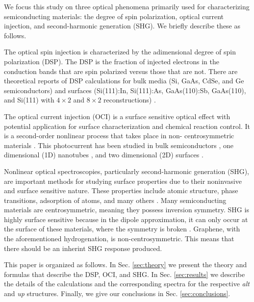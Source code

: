 \documentclass[pss]{wiley2sp} %
\begin{document}
We focus this study on three optical phenomena primarily used for
characterizing semiconducting materials: the degree of spin polarization,
optical current injection, and second-harmonic generation (SHG). We briefly
describe these as follows.

The optical spin injection is characterized by the adimensional degree of spin
polarization (DSP). The DSP is the fraction of injected electrons in the
conduction bands that are spin polarized versus those that are not. There are
theoretical reports of DSP calculations for bulk media (Si, GaAs, CdSe, and Ge
semiconductors) \cite{nastos2007full,cabellos2009stress,rioux2010optical} and
surfaces (Si(111):In, Si(111):As, GaAs(110):Sb, GaAs(110), and Si(111) with
$4\times2$ and $8\times2$ reconstructions)
\cite{mendoza2012optical,arzate2014optical}.

The optical current injection (OCI) is a surface sensitive optical effect with
potential application for surface characterization and chemical reaction
control. It is a second-order nonlinear process that takes place in non-
centrosymmetric materials \cite{nastos2006optical,cabellos2011optical,%
bhat2005excitonic,fraser1999quantum}. This photocurrent has been studied in
bulk semiconductors \cite{atanasov1996coherent,sipe2000second}, one
dimensional (1D) nanotubes \cite{mele2000coherent,kral2000photogalvanic}, and
two dimensional (2D) surfaces \cite{mele2000coherent,cabellos2011optical}.

Nonlinear optical spectroscopies, particularly second-harmonic generation
(SHG), are important methods for studying surface properties due to their
noninvasive and surface sensitive nature. These properties include atomic
structure, phase transitions, adsorption of atoms, and many others \cite{dadap
1997second,daum1993identification,mcgilp1994probing,power1995resonant,godefroy
1996electric,salazar2014molecular,chen1981surface,mendoza1998microscopic}.
Many semiconducting materials are centrosymmetric, meaning they possess
inversion symmetry. SHG is highly surface sensitive because in the dipole
approximation, it can only occur at the surface of these materials, where the
symmetry is broken \cite{bloembergen1962light,andersonPRB15,sipe2000second}.
Graphene, with the aforementioned hydrogenation, is non-centrosymmetric. This
means that there should be an inherint SHG response produced.

This paper is organized as follows. In Sec. \ref{sec:theory} we present the
theory and formulas that describe the DSP, OCI, and SHG. In Sec.
\ref{sec:results} we describe the details of the calculations and the
corresponding spectra for the respective \emph{alt} and \emph{up} structures.
Finally, we give our conclusions in Sec. \ref{sec:conclusions}.
\end{document}
